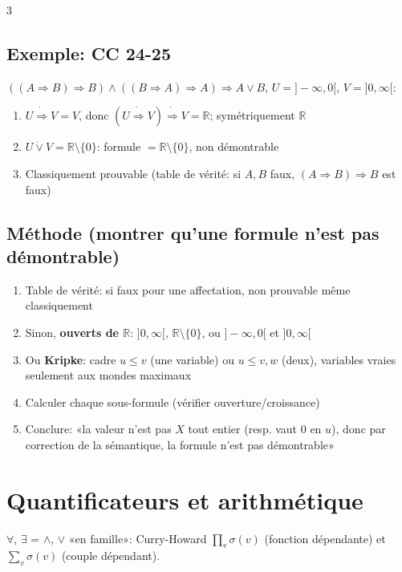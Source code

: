 \documentclass[12pt, a4paper]{article}
\providecommand{\R}{\mathbb{R}}
\begin{document}
\begin{multicols*}{3}
	\subsection{Exemple: CC 24-25}
	$((A\Rightarrow B)\Rightarrow B)\wedge((B\Rightarrow A)\Rightarrow A)\Rightarrow A\vee B$, $U=]-\infty,0[$, $V=]0,\infty[$:
	\begin{enumerate}[\roman*.]
		\item $U\dot\Rightarrow V=V$, donc $(U\dot\Rightarrow V)\dot\Rightarrow V=\R$; symétriquement $\R$
		\item $U\dot\vee V=\R\setminus\{0\}$: formule $=\R\setminus\{0\}$, non démontrable
		\item Classiquement prouvable (table de vérité: si $A,B$ faux, $(A\Rightarrow B)\Rightarrow B$ est faux)
	\end{enumerate}

	\subsection{Méthode (montrer qu'une formule n'est pas démontrable)}
	\begin{enumerate}[\roman*.]
		\item Table de vérité: si faux pour une affectation, non prouvable même classiquement
		\item Sinon, \textbf{ouverts de $\R$}: $]0,\infty[$, $\R\setminus\{0\}$, ou $]-\infty,0[$ et $]0,\infty[$
		\item Ou \textbf{Kripke}: cadre $u\leq v$ (une variable) ou $u\leq v,w$ (deux), variables vraies seulement aux mondes maximaux
		\item Calculer chaque sous-formule (vérifier ouverture/croissance)
		\item Conclure: «la valeur n'est pas $X$ tout entier (resp. vaut 0 en $u$), donc par correction de la sémantique, la formule n'est pas démontrable»
	\end{enumerate}

	\colbreak
	\section{Quantificateurs et arithmétique}
	$\forall$, $\exists$ = $\wedge$, $\vee$ «en famille»: Curry-Howard $\prod_v\sigma(v)$ (fonction dépendante) et $\sum_v\sigma(v)$ (couple dépendant).


\end{multicols*}
\end{document}
